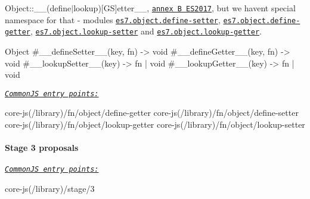 \begin{DoxyItemize}
\item {\ttfamily Object\+::\+\_\+\+\_\+(define$\vert$lookup)\mbox{[}GS\mbox{]}etter\+\_\+\+\_\+}, \href{https://github.com/tc39/ecma262/pull/381}{\tt annex B E\+S2017}, but we haven\textquotesingle{}t special namespace for that -\/ modules \href{https://github.com/zloirock/core-js/blob/v2.6.0/modules/es7.object.define-setter.js}{\tt {\ttfamily es7.\+object.\+define-\/setter}}, \href{https://github.com/zloirock/core-js/blob/v2.6.0/modules/es7.object.define-getter.js}{\tt {\ttfamily es7.\+object.\+define-\/getter}}, \href{https://github.com/zloirock/core-js/blob/v2.6.0/modules/es7.object.lookup-setter.js}{\tt {\ttfamily es7.\+object.\+lookup-\/setter}} and \href{https://github.com/zloirock/core-js/blob/v2.6.0/modules/es7.object.lookup-getter.js}{\tt {\ttfamily es7.\+object.\+lookup-\/getter}}. 
\begin{DoxyCode}
Object
  #\_\_defineSetter\_\_(key, fn) -> void
  #\_\_defineGetter\_\_(key, fn) -> void
  #\_\_lookupSetter\_\_(key) -> fn | void
  #\_\_lookupGetter\_\_(key) -> fn | void
\end{DoxyCode}
 \href{#commonjs}{\tt {\itshape Common\+JS entry points\+:}} 
\begin{DoxyCode}
core-js(/library)/fn/object/define-getter
core-js(/library)/fn/object/define-setter
core-js(/library)/fn/object/lookup-getter
core-js(/library)/fn/object/lookup-setter
\end{DoxyCode}

\end{DoxyItemize}

\paragraph*{Stage 3 proposals}

\href{#commonjs}{\tt {\itshape Common\+JS entry points\+:}} 
\begin{DoxyCode}
core-js(/library)/stage/3
\end{DoxyCode}

